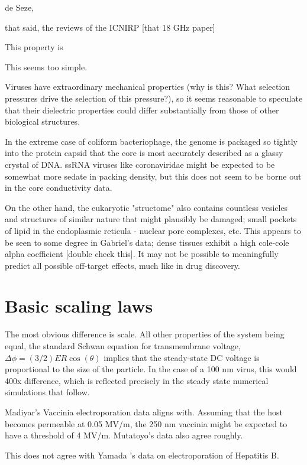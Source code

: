 \documentclass[fleqn,10pt]{paper}
\begin{document}
de Seze, 

that said, the reviews of the ICNIRP [that 18 GHz  paper]

This property is 
\cite{Nanosecond2006b} 


This seems too simple.

Viruses have extraordinary mechanical properties (why is this? What selection pressures drive the selection of this pressure?), so it seems reasonable to speculate that their dielectric properties could differ substantially from those of other biological structures. 

In the extreme case of coliform bacteriophage, the genome is packaged so tightly into the protein capsid that the core is most accurately described as a glassy crystal of DNA\cite{Conformation2007}. ssRNA viruses like coronaviridae might be expected to be somewhat more sedate in packing density, but this does not seem to be borne out in the core conductivity data.

On the other hand, the eukaryotic "structome" also contains countless vesicles and structures of similar nature that might plausibly be damaged; small pockets of lipid in the endoplasmic reticula - nuclear pore complexes, etc. This appears to be seen to some degree in Gabriel's data; dense tissues exhibit a high cole-cole alpha coefficient [double check this]. It may not be possible to meaningfully predict all possible off-target effects, much like in drug discovery.


\section*{Basic scaling laws}

The most obvious difference is scale. All other properties of the system being equal, the standard Schwan equation for transmembrane voltage, $\Delta \phi = (3/2) E R \cos(\theta)$ implies that the steady-state DC voltage is proportional to the size of the particle. In the case of a 100 nm virus, this would 400x difference, which is reflected precisely in the steady state numerical simulations that follow.

Madiyar's Vaccinia electroporation data aligns with. Assuming that the host becomes permeable at 0.05 MV/m, the 250 nm vaccinia might be expected to have a threshold of 4 MV/m. Mutatoyo's data also agree roughly.  

This does not agree with Yamada \cite{Electroporation2012}'s data on electroporation of Hepatitis B.
\end{document}
